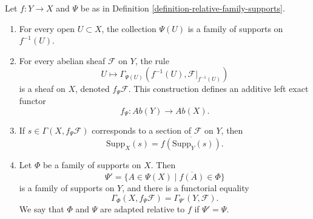 \begin{lemma}
\label{lemma-relative-direct-image-family-supports}
\begin{reference}
\cite[Chapter III, \S 3.7, pp. 171--172]{Tohoku}
\end{reference}
Let $f : Y \to X$ and $\Psi$ be as in Definition
\ref{definition-relative-family-supports}.
\begin{enumerate}
\item For every open $U \subset X$, the collection $\Psi(U)$ is a family
of supports on $f^{-1}(U)$.
\item For every abelian sheaf $\mathcal{F}$ on $Y$, the rule
$$
U \longmapsto
\Gamma_{\Psi(U)}(f^{-1}(U), \mathcal{F}|_{f^{-1}(U)})
$$
is a sheaf on $X$, denoted $f_\Psi\mathcal{F}$. This construction defines
an additive left exact functor
$$
f_\Psi : \textit{Ab}(Y) \longrightarrow \textit{Ab}(X).
$$
\item If $s \in \Gamma(X, f_\Psi\mathcal{F})$ corresponds to a section of
$\mathcal{F}$ on $Y$, then
$$
\text{Supp}_X(s) = \overline{f(\text{Supp}_Y(s))}.
$$
\item Let $\Phi$ be a family of supports on $X$. Then
$$
\Psi' = \{A \in \Psi(X) \mid \overline{f(A)} \in \Phi\}
$$
is a family of supports on $Y$, and there is a functorial equality
$$
\Gamma_\Phi(X, f_\Psi\mathcal{F})
= \Gamma_{\Psi'}(Y, \mathcal{F}).
$$
We say that $\Phi$ and $\Psi$ are adapted relative to $f$ if
$\Psi'=\Psi$.
\end{enumerate}
\end{lemma}

